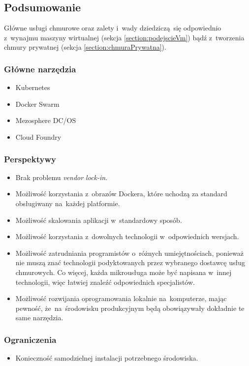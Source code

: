 \documentclass[12pt,a4paper,twoside,titlepage,openright]{book}
\begin{document}
\subsection*{Podsumowanie}

Główne usługi chmurowe oraz zalety i~wady dziedziczą~się odpowiednio z~wynajmu maszyny wirtualnej (sekcja \ref{section:podejscieVm}) bądź z~tworzenia chmury prywatnej (sekcja \ref{section:chmuraPrywatna}).

\subsubsection{Główne narzędzia}
\begin{itemize}
\item Kubernetes
\item Docker Swarm
\item Mezosphere DC/OS
\item Cloud Foundry
\end{itemize}

\subsubsection{Perspektywy}
\begin{itemize}
\item Brak problemu \textit{vendor lock-in}.
\item Możliwość korzystania z~obrazów Dockera, które uchodzą za standard obsługiwany na~każdej platformie.
\item Możliwość skalowania aplikacji w~standardowy sposób.
\item Możliwość korzystania z~dowolnych technologii w~odpowiednich wersjach.
\item Możliwość zatrudniania programistów o~różnych umiejętnościach, ponieważ nie muszą znać technologii podyktowanych przez wybranego dostawcę usług chmurowych. Co więcej, każda mikrousługa może być napisana w~innej technologii, więc łatwiej znaleźć odpowiednich specjalistów.
\item Możliwość rozwijania oprogramowania lokalnie na~komputerze, mając pewność, że~na~środowisku produkcyjnym będą obowiązywały dokładnie te same narzędzia.
\end{itemize}

\subsubsection{Ograniczenia}
\begin{itemize}
\item Konieczność samodzielnej instalacji potrzebnego środowiska.
\end{itemize}
\end{document}
